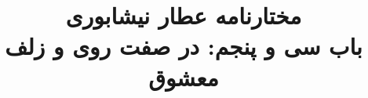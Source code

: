 \documentclass[14pt,b5paper]{article}
\begin{document}
\title{\Huge مختارنامه عطار نیشابوری \\
باب سی و پنجم: در صفت روی و زلف معشوق}
\author{ }
\date{ }
\maketitle
\newpage
\tableofcontents
\newpage

\newpage

\newpage

\newpage

\newpage

\newpage

\newpage

\newpage

\newpage

\newpage

\newpage

\newpage

\newpage

\newpage

\newpage

\newpage

\newpage

\newpage

\newpage

\newpage

\newpage

\newpage

\newpage

\newpage

\newpage

\newpage

\newpage

\newpage

\newpage

\newpage

\newpage

\newpage

\newpage

\newpage

\newpage

\newpage

\newpage

\newpage

\newpage

\newpage

\newpage

\newpage

\newpage

\newpage

\newpage

\newpage

\newpage

\newpage

\newpage

\newpage

\newpage

\newpage

\newpage

\newpage

\newpage

\newpage

\newpage

\newpage

\newpage

\newpage

\newpage

\newpage

\newpage

\newpage

\newpage

\newpage

\newpage

\newpage

\newpage

\newpage

\newpage

\newpage

\newpage

\newpage

\newpage

\newpage

\newpage
\end{document}
